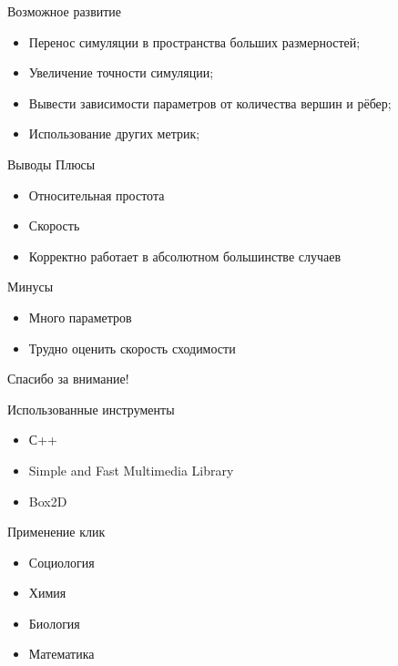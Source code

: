 \documentclass{beamer}
\theoremstyle{plain}
\begin{document}
\begin{frame}{Возможное развитие}
  \begin{itemize}
    \item Перенос симуляции в пространства больших размерностей;
    \item Увеличение точности симуляции;
    \item Вывести зависимости параметров от количества вершин и рёбер;
    \item Использование других метрик;
  \end{itemize}
\end{frame}

\begin{frame}{Выводы}
  Плюсы
  \begin{itemize}
    \item Относительная простота
    \item Скорость
    \item Корректно работает в абсолютном большинстве случаев
  \end{itemize}

  Минусы
  \begin{itemize}
    \item Много параметров
    \item Трудно оценить скорость сходимости
  \end{itemize}
\end{frame}


\begin{frame}
  \begin{center}
  \LARGE{Спасибо за внимание!}
  \end{center}
\end{frame}

\begin{frame}{Использованные инструменты}
  \begin{itemize}
    \item С++
    \item Simple and Fast Multimedia Library
    \item Box2D
  \end{itemize}
\end{frame}

\begin{frame}{Применение клик}
  \begin{itemize}
    \item Социология
    \item Химия
    \item Биология
    \item Математика
  \end{itemize}
\end{frame}
\end{document}
